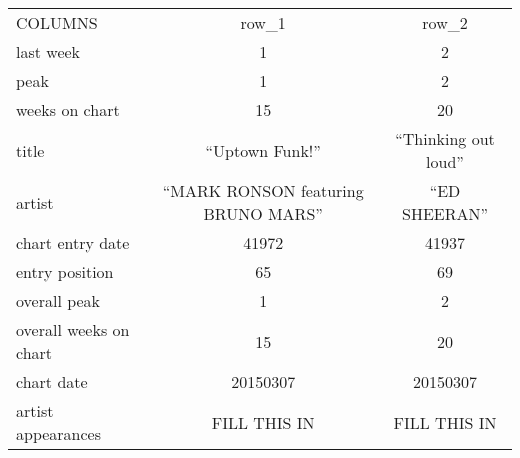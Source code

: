 \documentclass[11pt]{article} %
\begin{document}
\begin{table}[H]
	\centering
	\begin{tabular}{|l|c|c|}
		COLUMNS & row\_1 & row\_2 \\
		last week              & 1 & 2 \\
		peak                   & 1 & 2 \\
		weeks on chart         & 15 & 20 \\
		title                  & ``Uptown Funk!'' & ``Thinking out loud'' \\
		artist                 & ``MARK RONSON featuring BRUNO MARS'' & ``ED SHEERAN'' \\
		chart entry date       & 41972 & 41937 \\
		entry position         & 65 & 69 \\
		overall peak           & 1 & 2 \\
		overall weeks on chart & 15 & 20 \\
		chart date             & 20150307 & 20150307 \\
		artist appearances     & FILL THIS IN & FILL THIS IN\\
	\end{tabular}
\end{table}

\end{document}
